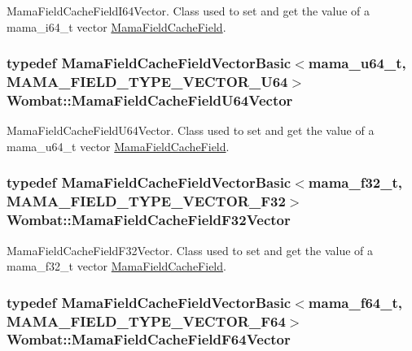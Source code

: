 MamaFieldCacheFieldI64Vector. Class used to set and get the value of a mama\_\-i64\_\-t vector {\ttfamily \hyperlink{classWombat_1_1MamaFieldCacheField}{MamaFieldCacheField}}. \hypertarget{namespaceWombat_ab7d7e6b770748f8bbe7fc34ba3b3a179}{
\subsubsection[{MamaFieldCacheFieldU64Vector}]{\setlength{\rightskip}{0pt plus 5cm}typedef {\bf MamaFieldCacheFieldVectorBasic}$<$mama\_\-u64\_\-t, MAMA\_\-FIELD\_\-TYPE\_\-VECTOR\_\-U64$>$ {\bf Wombat::MamaFieldCacheFieldU64Vector}}}
\label{namespaceWombat_ab7d7e6b770748f8bbe7fc34ba3b3a179}


MamaFieldCacheFieldU64Vector. Class used to set and get the value of a mama\_\-u64\_\-t vector {\ttfamily \hyperlink{classWombat_1_1MamaFieldCacheField}{MamaFieldCacheField}}. \hypertarget{namespaceWombat_a46f328c8d635dcebb34437c5c7d1c678}{
\subsubsection[{MamaFieldCacheFieldF32Vector}]{\setlength{\rightskip}{0pt plus 5cm}typedef {\bf MamaFieldCacheFieldVectorBasic}$<$mama\_\-f32\_\-t, MAMA\_\-FIELD\_\-TYPE\_\-VECTOR\_\-F32$>$ {\bf Wombat::MamaFieldCacheFieldF32Vector}}}
\label{namespaceWombat_a46f328c8d635dcebb34437c5c7d1c678}


MamaFieldCacheFieldF32Vector. Class used to set and get the value of a mama\_\-f32\_\-t vector {\ttfamily \hyperlink{classWombat_1_1MamaFieldCacheField}{MamaFieldCacheField}}. \hypertarget{namespaceWombat_a9642bdcd737b2de5dfcf6c1b2cd3253e}{
\subsubsection[{MamaFieldCacheFieldF64Vector}]{\setlength{\rightskip}{0pt plus 5cm}typedef {\bf MamaFieldCacheFieldVectorBasic}$<$mama\_\-f64\_\-t, MAMA\_\-FIELD\_\-TYPE\_\-VECTOR\_\-F64$>$ {\bf Wombat::MamaFieldCacheFieldF64Vector}}}
\label{namespaceWombat_a9642bdcd737b2de5dfcf6c1b2cd3253e}


